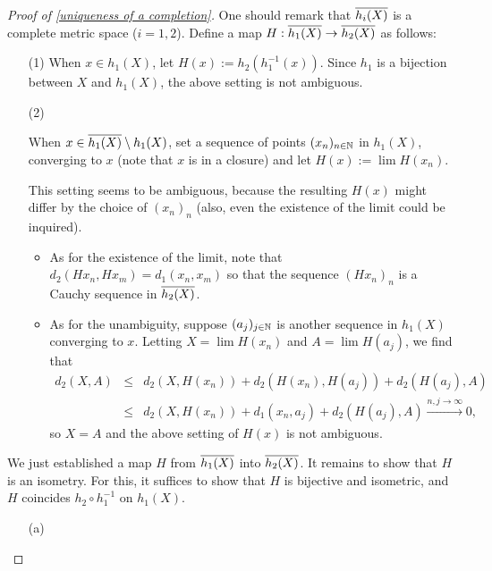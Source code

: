 \begin{proof}[Proof of \cref{uniqueness of a completion}]
    One should remark that $\overline{h_i(X)}$ is a complete metric space ($i=1, 2$).
    Define a map $H: \overline{h_1(X)}\rightarrow\overline{h_2(X)}$ as follows:
    \begin{enumerate}
        \item[(1)]
        {
            When $x\in h_1(X)$, let $H(x):=h_2(h_1^{-1}(x))$.
            Since $h_1$ is a bijection between $X$ and $h_1(X)$, the above setting is not ambiguous.
        }
        \item[(2)]
        {
            When $x\in \overline{h_1(X)}\setminus h_1(X)$, set a sequence of points $(x_n)_{n\in{\mathbb{N}}}$ in $h_1(X)$, converging to $x$ (note that $x$ is in a closure) and let $H(x):=\lim H(x_n)$.

            This setting seems to be ambiguous, because the resulting $H(x)$ might differ by the choice of $(x_n)_n$ (also, even the existence of the limit could be inquired).
            \begin{itemize}
                \item
                {
                    As for the existence of the limit, note that $d_2(Hx_n, Hx_m)=d_1(x_n, x_m)$ so that the sequence $(Hx_n)_n$ is a Cauchy sequence in $\overline{h_2(X)}$.
                }
                \item
                {
                    As for the unambiguity, suppose $(a_j)_{j\in{\mathbb{N}}}$ is another sequence in $h_1(X)$ converging to $x$.
                    Letting $X=\lim H(x_n)$ and $A=\lim H(a_j)$, we find that
                    \begin{eqnarray*}
                        d_2(X, A)&\leq&d_2(X, H(x_n))+d_2(H(x_n), H(a_j))+d_2(H(a_j), A)\\
                        &\leq&d_2(X, H(x_n))+d_1(x_n, a_j)+d_2(H(a_j), A)\xrightarrow{n, j\rightarrow\infty}0,
                    \end{eqnarray*}
                    so $X=A$ and the above setting of $H(x)$ is not ambiguous.
                }
            \end{itemize}
        }
    \end{enumerate}
    We just established a map $H$ from $\overline{h_1(X)}$ into $\overline{h_2(X)}$.
    It remains to show that $H$ is an isometry.
    For this, it suffices to show that $H$ is bijective and isometric, and $H$ coincides $h_2\circ h_1^{-1}$ on $h_1(X)$.
    \begin{enumerate}
        \item[(a)]

\end{enumerate}
\end{proof}
